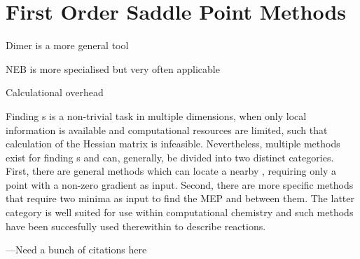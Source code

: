 \chapter{First Order Saddle Point Methods}
\label{chap:saddle-point-methods}

\bit
\item Dimer is a more general tool
\item NEB is more specialised but very often applicable
\item Calculational overhead
\eit

Finding \sap{}s is a non-trivial task in multiple dimensions, when only local information is available and computational resources are limited, such that calculation of the Hessian matrix is infeasible.
Nevertheless, multiple methods exist for finding s and can, generally, be divided into two distinct categories.
First, there are general methods which can locate a nearby , requiring only a point with a non-zero gradient as input.
Second, there are more specific methods that require two minima as input to find the MEP and  between them.
The latter category is well suited for use within computational chemistry and such methods have been succesfully used therewithin to describe reactions.

---Need a bunch of citations here

\incomplete




